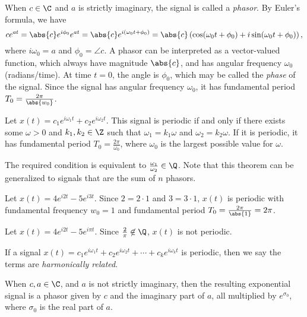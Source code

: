 \documentclass[12pt]{article}
\begin{document}
When $c \in \C$ and $a$ is strictly imaginary, the signal is called a \emph{phasor}. By Euler's formula, we have \[ce^{at} = \abs{c}e^{i\phi_0}e^{at} = \abs{c}e^{i(\omega_0t + \phi_0)} = \abs{c}\left(\cos(\omega_0t + \phi_0) + i\sin(\omega_0t + \phi_0)\right),\] where $i\omega_0 = a$ and $\phi_0 = \angle c$. A phasor can be interpreted as a vector-valued function, which always have magnitude $\abs{c}$, and has angular frequency $\omega_0$ (radians/time). At time $t = 0$, the angle is $\phi_0$, which may be called the \emph{phase} of the signal. Since the signal has angular frequency $\omega_0$, it has fundamental period $T_0 = \frac{2\pi}{\abs{w_0}}$.

\begin{thm}
    Let $x(t) = c_1e^{i\omega_1t} + c_2e^{i\omega_2t}$. This signal is periodic if and only if there exists some $\omega > 0$ and $k_1, k_2 \in \Z$ such that $\omega_1 = k_1\omega$ and $\omega_2 = k_2\omega$. If it is periodic, it has fundamental period $T_0 = \frac{2\pi}{\omega_0}$, where $\omega_0$ is the largest possible value for $\omega$.
\end{thm}

\begin{rmk}
    The required condition is equivalent to $\frac{\omega_1}{\omega_2} \in \Q$. Note that this theorem can be generalized to signals that are the sum of $n$ phasors.
\end{rmk}

\begin{exmp}
    Let $x(t) = 4e^{i2t} - 5e^{i3t}$. Since $2 = 2\cdot 1$ and $3 = 3 \cdot 1$, $x(t)$ is periodic with fundamental frequency $w_0 = 1$ and fundamental period $T_0 = \frac{2\pi}{\abs{1}} = 2\pi$.
\end{exmp}

\begin{exmp}
    Let $x(t) = 4e^{i2t} - 5e^{i\pi t}$. Since $\frac{2}{\pi} \not\in \Q$, $x(t)$ is not periodic.
\end{exmp}

\begin{defn}
    If a signal $x(t) = c_1e^{i\omega_1t} + c_2e^{i\omega_2t} + \cdots + c_ke^{i\omega_kt}$ is periodic, then we say the terms are \emph{harmonically related}.
\end{defn}

When $c, a \in \C$, and $a$ is not strictly imaginary, then the resulting exponential signal is a phasor given by $c$ and the imaginary part of $a$, all multiplied by $e^{\sigma_0}$, where $\sigma_0$ is the real part of $a$.
\end{document}
